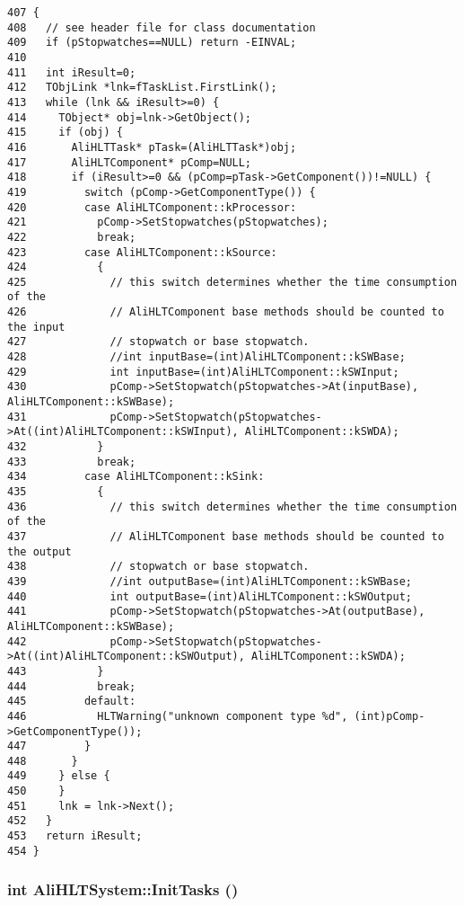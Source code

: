 \footnotesize\begin{verbatim}407 {
408   // see header file for class documentation
409   if (pStopwatches==NULL) return -EINVAL;
410 
411   int iResult=0;
412   TObjLink *lnk=fTaskList.FirstLink();
413   while (lnk && iResult>=0) {
414     TObject* obj=lnk->GetObject();
415     if (obj) {
416       AliHLTTask* pTask=(AliHLTTask*)obj;
417       AliHLTComponent* pComp=NULL;
418       if (iResult>=0 && (pComp=pTask->GetComponent())!=NULL) {
419         switch (pComp->GetComponentType()) {
420         case AliHLTComponent::kProcessor:
421           pComp->SetStopwatches(pStopwatches);
422           break;
423         case AliHLTComponent::kSource:
424           {
425             // this switch determines whether the time consumption of the
426             // AliHLTComponent base methods should be counted to the input
427             // stopwatch or base stopwatch.
428             //int inputBase=(int)AliHLTComponent::kSWBase;
429             int inputBase=(int)AliHLTComponent::kSWInput;
430             pComp->SetStopwatch(pStopwatches->At(inputBase), AliHLTComponent::kSWBase);
431             pComp->SetStopwatch(pStopwatches->At((int)AliHLTComponent::kSWInput), AliHLTComponent::kSWDA);
432           }
433           break;
434         case AliHLTComponent::kSink:
435           {
436             // this switch determines whether the time consumption of the
437             // AliHLTComponent base methods should be counted to the output
438             // stopwatch or base stopwatch.
439             //int outputBase=(int)AliHLTComponent::kSWBase;
440             int outputBase=(int)AliHLTComponent::kSWOutput;
441             pComp->SetStopwatch(pStopwatches->At(outputBase), AliHLTComponent::kSWBase);
442             pComp->SetStopwatch(pStopwatches->At((int)AliHLTComponent::kSWOutput), AliHLTComponent::kSWDA);
443           }
444           break;
445         default:
446           HLTWarning("unknown component type %d", (int)pComp->GetComponentType());
447         }
448       }
449     } else {
450     }
451     lnk = lnk->Next();
452   }
453   return iResult;
454 }
\end{verbatim}\normalsize 


\subsubsection{\setlength{\rightskip}{0pt plus 5cm}int Ali\-HLTSystem::Init\-Tasks ()}\label{classAliHLTSystem_a14}


